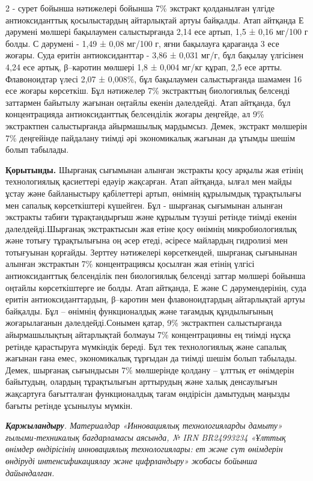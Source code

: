 \begin{multicols}{2}
2 - сурет бойынша нәтижелері бойынша 7\% экстракт қолданылған үлгіде
антиоксиданттық қосылыстардың айтарлықтай артуы байқалды. Атап айтқанда
Е дәрумені мөлшері бақылаумен салыстырғанда 2,14 есе артып, 1,5 ± 0,16
мг/100 г болды. С дәрумені - 1,49 ± 0,08 мг/100 г, яғни бақылауға
қарағанда 3 есе жоғары. Суда еритін антиоксиданттар - 3,86 ± 0,031 мг/г,
бұл бақылау үлгісінен 4,24 есе артық, β--каротин мөлшері 1,8 ± 0,004
мг/кг құрап, 2,5 есе артты. Флавоноидтар үлесі 2,07 ± 0,008\%, бұл
бақылаумен салыстырғанда шамамен 16 есе жоғары көрсеткіш. Бұл нәтижелер
7\% экстракттың биологиялық белсенді заттармен байытылу жағынан оңтайлы
екенін дәлелдейді. Атап айтқанда, бұл концентрацияда антиоксиданттық
белсенділік жоғары деңгейде, ал 9\% экстрактпен салыстырғанда
айырмашылық мардымсыз. Демек, экстракт мөлшерін 7\% деңгейінде пайдалану
тиімді әрі экономикалық жағынан да ұтымды шешім болып табылады.

{\bfseries Қорытынды.} Шырғанақ сығымынан алынған экстракты қосу арқылы жая
етінің технологиялық қасиеттері едәуір жақсарған. Атап айтқанда, ылғал
мен майды ұстау және байланыстыру қабілеттері артып, өнімнің құрылымдық
тұрақтылығы мен сапалық көрсеткіштері күшейген. Бұл - шырғанақ сығымынан
алынған экстракты табиғи тұрақтандырғыш және құрылым түзуші ретінде
тиімді екенін дәлелдейді.Шырғанақ экстрактысын жая етіне қосу өнімнің
микробиологиялық және тотығу тұрақтылығына оң әсер етеді,
әсіресе майлардың гидролизі мен тотығуынан қорғайды. Зерттеу нәтижелері
көрсеткендей, шырғанақ сығынынан алынған экстрактын 7\% концентрациясы
қосылған жая етінің үлгісі антиоксиданттық белсенділік пен биологиялық
белсенді заттар мөлшері бойынша оңтайлы көрсеткіштерге ие болды. Атап
айтқанда, Е және С дәрумендерінің, суда еритін антиоксиданттардың,
β--каротин мен флавоноидтардың айтарлықтай артуы байқалды. Бұл --
өнімнің функционалдық және тағамдық құндылығының жоғарылағанын
дәлелдейді.Сонымен қатар, 9\% экстрактпен салыстырғанда айырмашылықтың
айтарлықтай болмауы 7\% концентрацияны ең тиімді нұсқа ретінде
қарастыруға мүмкіндік береді. Бұл тек технологиялық және сапалық жағынан
ғана емес, экономикалық тұрғыдан да тиімді шешім болып табылады. Демек,
шырғанақ сығындысын 7\% мөлшерінде қолдану -- ұлттық ет өнімдерін
байытудың, олардың тұрақтылығын арттырудың және халық денсаулығын
жақсартуға бағытталған функционалдық тағам өндірісін дамытудың маңызды
бағыты ретінде ұсынылуы мүмкін.

\emph{{\bfseries Қаржыландыру}. Материалдар «Инновациялық технологияларды
дамыту» ғылыми-техникалық бағдарламасы аясында, № IRN BR24993234 «Ұлттық
өнімдер өндірісінің инновациялық технологиялары: ет және сүт өнімдерін
өндіруді интенсификациялау және цифрландыру» жобасы бойынша
дайындалған.}
\end{multicols}

